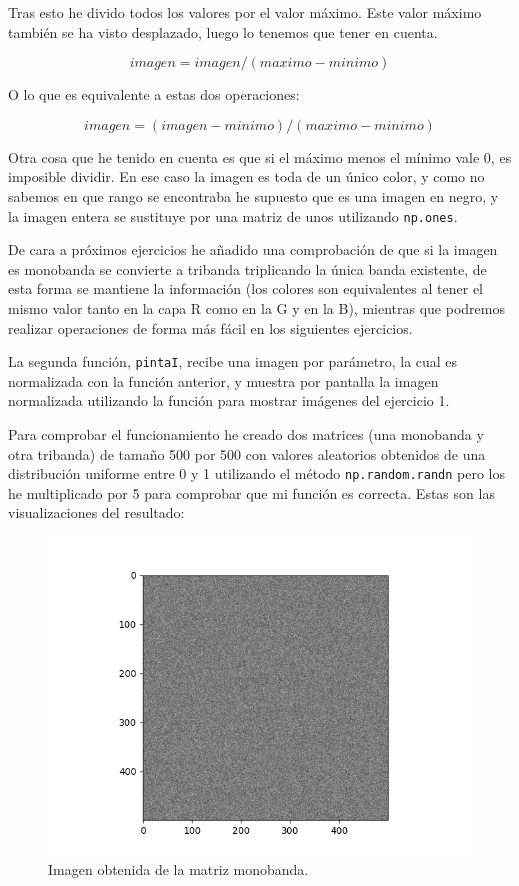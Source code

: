 \documentclass[12pt, spanish]{article}
\begin{document}
Tras esto he divido todos los valores por el valor máximo. Este valor máximo también se ha visto desplazado, luego lo tenemos que tener en cuenta.

$$ imagen = imagen / (maximo - minimo) $$

O lo que es equivalente a estas dos operaciones:

$$ imagen = (imagen - minimo) / (maximo - minimo) $$

Otra cosa que he tenido en cuenta es que si el máximo menos el mínimo vale 0, es imposible dividir. En ese caso la imagen es toda de un único color, y como no sabemos en que rango se encontraba he supuesto que es una imagen en negro, y la imagen entera se sustituye por una matriz de unos utilizando \texttt{np.ones}.

De cara a próximos ejercicios he añadido una comprobación de que si la imagen es monobanda se convierte a tribanda triplicando la única banda existente, de esta forma se mantiene la información (los colores son equivalentes al tener el mismo valor tanto en la capa R como en la G y en la B), mientras que podremos realizar operaciones de forma más fácil en los siguientes ejercicios.


La segunda función, \texttt{pintaI}, recibe una imagen por parámetro, la cual es normalizada con la función anterior, y muestra por pantalla la imagen normalizada utilizando la función para mostrar imágenes del ejercicio 1.

Para comprobar el funcionamiento he creado dos matrices (una monobanda y otra tribanda) de tamaño 500 por 500 con valores aleatorios obtenidos de una distribución uniforme entre 0 y 1 utilizando el método \texttt{np.random.randn} pero los he multiplicado por 5 para comprobar que mi función es correcta. Estas son las visualizaciones del resultado:

\begin{figure}[H]
	\centering
	\includegraphics[scale = 0.70]{monobanda.png}
	\caption{Imagen obtenida de la matriz monobanda.}
	\label{fig:ej2-mono}
	
\end{figure}
\end{document}
